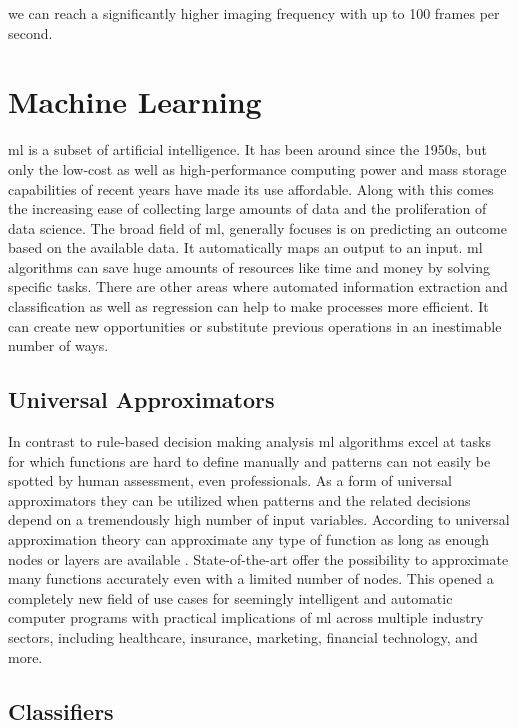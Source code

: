 we can reach a significantly higher imaging frequency with up to 100 frames per second. \cite{HiramG.Bezerra.2009, Gessert.2019}

\section{Machine Learning}

\Acrshort{ml} is a subset of artificial intelligence. It has been around since the 1950s, but only the low-cost as well as high-performance computing power and mass storage capabilities of recent years have made its use affordable. Along with this comes the increasing ease of collecting large amounts of data and the proliferation of data science. The broad field of \acrshort{ml}, generally focuses is on predicting an outcome based on the available data. It automatically maps an output to an input. \Acrshort{ml} algorithms can save huge amounts of resources like time and money by solving specific tasks. There are other areas where automated information extraction and classification as well as \gls{regression} can help to make processes more efficient. It can create new opportunities or substitute previous operations in an inestimable number of ways.

\subsection{Universal Approximators}

In contrast to rule-based decision making analysis \acrshort{ml} algorithms excel at tasks for which functions are hard to define manually and patterns can not easily be spotted by human assessment, even professionals. As a form of universal approximators they can be utilized when patterns and the related decisions depend on a tremendously high number of input variables. According to universal approximation theory  can approximate any type of function as long as enough nodes or layers are available \cite{Barron.1993}. State-of-the-art  offer the possibility to approximate many functions accurately even with a limited number of nodes. This opened a completely new field of use cases for seemingly intelligent and automatic computer programs with practical implications of \acrshort{ml} across multiple industry sectors, including healthcare, insurance, marketing, financial technology, and more.

\subsection{Classifiers}

